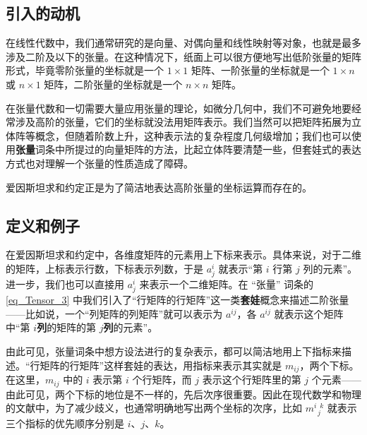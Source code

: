 
\begin{issues}
\end{issues}



\subsection{引入的动机}

在线性代数中，我们通常研究的是向量、对偶向量和线性映射等对象，也就是最多涉及二阶及以下的张量。在这种情况下，纸面上可以很方便地写出低阶张量的矩阵形式，毕竟零阶张量的坐标就是一个 $1\times 1$ 矩阵、一阶张量的坐标就是一个 $1\times n$ 或 $n\times 1$ 矩阵，二阶张量的坐标就是一个 $n\times n$ 矩阵。

在张量代数和一切需要大量应用张量的理论，如微分几何中，我们不可避免地要经常涉及高阶的张量，它们的坐标就没法用矩阵表示。我们当然可以把矩阵拓展为立体阵等概念，但随着阶数上升，这种表示法的复杂程度几何级增加；我们也可以使用\textbf{张量}词条中所提过的向量矩阵的方法，比起立体阵要清楚一些，但套娃式的表达方式也对理解一个张量的性质造成了障碍。

爱因斯坦求和约定正是为了简洁地表达高阶张量的坐标运算而存在的。

\subsection{定义和例子}

在爱因斯坦求和约定中，各维度矩阵的元素用上下标来表示。具体来说，对于二维的矩阵，上标表示行数，下标表示列数，于是 $a^i_j$ 就表示“第 $i$ 行第 $j$ 列的元素”。进一步，我们也可以直接用 $a^i_j$ 来表示一个二维矩阵。在 “张量” 词条的\autoref{eq_Tensor_3} 中我们引入了“行矩阵的行矩阵”这一类\textbf{套娃}概念来描述二阶张量——比如说，一个“列矩阵的列矩阵”就可以表示为 $a^{ij}$，各 $a^{ij}$ 就表示这个矩阵中“第 $i$\textbf{列}的矩阵的第 $j$\textbf{列}的元素”。

由此可见，张量词条中想方设法进行的复杂表示，都可以简洁地用上下指标来描述。“行矩阵的行矩阵”这样套娃的表达，用指标来表示其实就是 $m_{ij}$，两个下标。在这里，$m_{ij}$ 中的 $i$ 表示第 $i$ 个行矩阵，而 $j$ 表示这个行矩阵里的第 $j$ 个元素——由此可见，两个下标的地位是不一样的，先后次序很重要。因此在现代数学和物理的文献中，为了减少歧义，也通常明确地写出两个坐标的次序，比如 $m^{i\phantom{1}k}_{\phantom{1}j}$ 就表示三个指标的优先顺序分别是 $i$、$j$、$k$。

